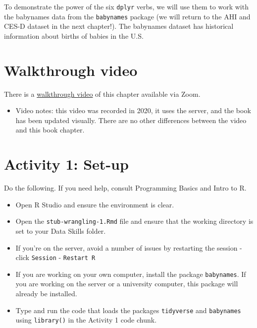 \documentclass[
  oneside]{book}
\providecommand{\tightlist}{%
  \setlength{\itemsep}{0pt}\setlength{\parskip}{0pt}}
\begin{document}
To demonstrate the power of the six \texttt{dplyr} verbs, we will use them to work with the babynames data from the \texttt{babynames} package (we will return to the AHI and CES-D dataset in the next chapter!). The babynames dataset has historical information about births of babies in the U.S.

\hypertarget{walkthrough-video-2}{%
\section{Walkthrough video}\label{walkthrough-video-2}}

There is a \href{https://uofglasgow.zoom.us/rec/play/cr3jnI9QXR0stOqd3nBv51BNrQrlkkzBN0_c8-Mtq7JOGrNW2jQEkbJqRMhh5W7lJLSQEfZfFIZJTvL5.-imkxiOU0A-aTdpM?continueMode=true\&_x_zm_rtaid=cW5f8v0JQcOlLI1cBpI84g.1628694791961.c3bcc75dbabdfb3f3ac44f8fd7884865\&_x_zm_rhtaid=355}{walkthrough video} of this chapter available via Zoom.

\begin{itemize}
\tightlist
\item
  Video notes: this video was recorded in 2020, it uses the server, and the book has been updated visually. There are no other differences between the video and this book chapter.
\end{itemize}

\hypertarget{activity-1-set-up-1}{%
\section{Activity 1: Set-up}\label{activity-1-set-up-1}}

Do the following. If you need help, consult Programming Basics and Intro to R.

\begin{itemize}
\tightlist
\item
  Open R Studio and ensure the environment is clear.\\
\item
  Open the \texttt{stub-wrangling-1.Rmd} file and ensure that the working directory is set to your Data Skills folder.\\
\item
  If you're on the server, avoid a number of issues by restarting the session - click \texttt{Session} - \texttt{Restart\ R}\\
\item
  If you are working on your own computer, install the package \texttt{babynames}. If you are working on the server or a university computer, this package will already be installed.
\item
  Type and run the code that loads the packages \texttt{tidyverse} and \texttt{babynames} using \texttt{library()} in the Activity 1 code chunk.
\end{itemize}
\end{document}
